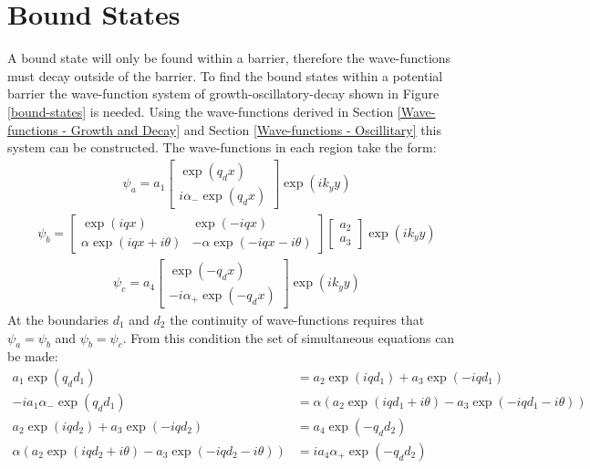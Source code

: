 \documentclass[12pt,a4paper]{report}
\begin{document}
			\section{Bound States}
			\label{Rectangular Barrier - Bound States}
				A bound state will only be found within a barrier, therefore the wave-functions must decay outside of the barrier. To find the bound states within a potential barrier the wave-function system of growth-oscillatory-decay shown in Figure \ref{bound-states} is needed. Using the wave-functions derived in Section \ref{Wave-functions - Growth and Decay} and Section \ref{Wave-functions - Oscillitary} this system can be constructed. The wave-functions in each region take the form:
				\begin{align}
					\psi_{a}=a_{1}
					\left[\begin{array}{ccc}
						\exp(q_{d}x)\\
						i\alpha_{-}\exp(q_{d}x)
					\end{array}\right]\exp(ik_{y}y)
				\end{align}
				\begin{align}
					\psi_{b}=
					\left[\begin{array}{ccc}
						\exp(iqx)&\exp(-iqx)\\
						\alpha \exp(iqx+i\theta)&-\alpha \exp(-iqx-i\theta)
					\end{array}\right]
					\left[\begin{array}{ccc}
						a_{2}\\
						a_{3}
					\end{array}\right]\exp(ik_{y}y)
				\end{align}
				\begin{align}
					\psi_{c}=a_{4}
					\left[\begin{array}{ccc}
						\exp(-q_{d}x)\\
						-i\alpha_{+}\exp(-q_{d}x)
					\end{array}\right]\exp(ik_{y}y)
				\end{align}
				At the boundaries $d_{1}$ and $d_{2}$ the continuity of wave-functions requires that $\psi_{a}=\psi_{b}$ and $\psi_{b}=\psi_{c}$. From this condition the set of simultaneous equations can be made:
				\begin{align}
					a_{1}\exp(q_{d}d_{1})&=a_{2}\exp(iqd_{1})+a_{3}\exp(-iqd_{1})\\
					-ia_{1}\alpha_{-}\exp(q_{d}d_{1})&=\alpha\left(a_{2}\exp(iqd_{1}+i\theta)-a_{3}\exp(-iqd_{1}-i\theta)\right)\\
					a_{2}\exp(iqd_{2})+a_{3}\exp(-iqd_{2})&=a_{4}\exp(-q_{d}d_{2})\\
					\alpha\left(a_{2}\exp(iqd_{2}+i\theta)-a_{3}\exp(-iqd_{2}-i\theta)\right)&=ia_{4}\alpha_{+}\exp(-q_{d}d_{2})
				\end{align}
\end{document}
